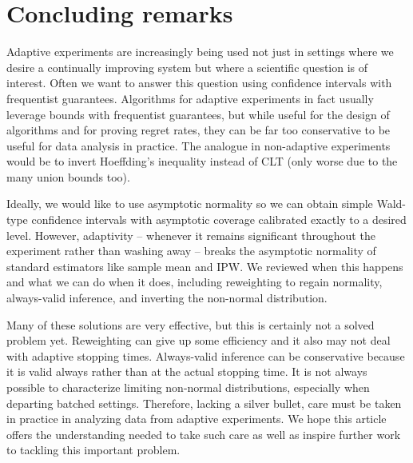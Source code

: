 \section{Concluding remarks}

Adaptive experiments are increasingly being used not just in settings where we desire a continually improving system but where a scientific question is of interest. Often we want to answer this question using confidence intervals with frequentist guarantees. Algorithms for adaptive experiments in fact usually leverage bounds with frequentist guarantees, but while useful for the design of algorithms and for proving regret rates, they can be far too conservative to be useful for data analysis in practice. The analogue in non-adaptive experiments would be to invert Hoeffding's inequality instead of CLT (only worse due to the many union bounds too).

Ideally, we would like to use asymptotic normality so we can obtain simple Wald-type confidence intervals with asymptotic coverage calibrated exactly to a desired level. However, adaptivity -- whenever it remains significant throughout the experiment rather than washing away -- breaks the asymptotic normality of standard estimators like sample mean and IPW. We reviewed when this happens and what we can do when it does, including reweighting to regain normality, always-valid inference, and inverting the non-normal distribution.

Many of these solutions are very effective, but this is certainly not a solved problem yet. Reweighting can give up some efficiency and it also may not deal with adaptive stopping times. Always-valid inference can be conservative because it is valid always rather than at the actual stopping time. It is not always possible to characterize limiting non-normal distributions, especially when departing batched settings. Therefore, lacking a silver bullet, care must be taken in practice in analyzing data from adaptive experiments. We hope this article offers the understanding needed to take such care as well as inspire further work to tackling this important problem.


  






